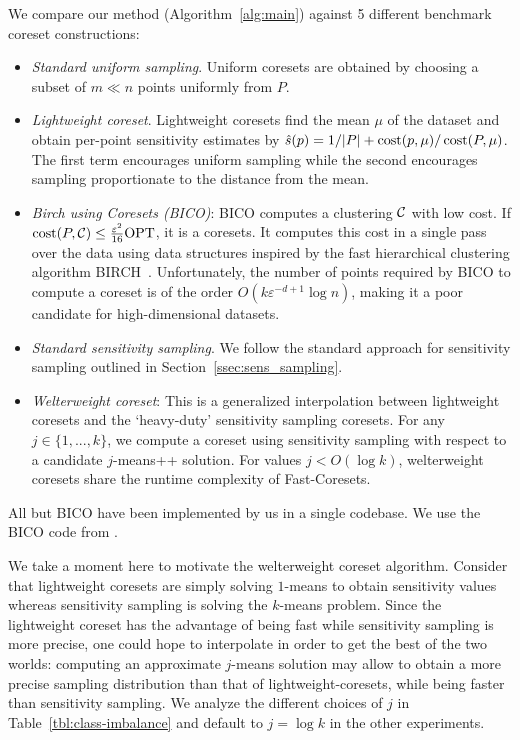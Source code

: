 We compare our method (Algorithm~\ref{alg:main}) against 5 different benchmark coreset constructions:
\begin{itemize}
        \item \emph{Standard uniform sampling}. Uniform coresets are obtained by choosing a subset of $m \ll n$ points uniformly from $P$.
        \item \emph{Lightweight coreset}. Lightweight coresets find the mean $\mu$ of the dataset and obtain per-point sensitivity estimates by $\hat{s}(p) = 1/|P| + \operatorname{cost}(p, \mu) / \operatorname{cost}(P, \mu)$.
            The first term encourages uniform sampling while the second encourages sampling proportionate to the distance from the mean.
        \item \emph{Birch using Coresets (BICO)}: BICO computes a clustering $\mathcal C$ with low cost. If $\operatorname{cost}(P,\mathcal C)\leq \frac{\varepsilon^2}{16} \text{OPT}$, it is a coresets. It computes this cost in a single pass over the data using data structures inspired by the fast hierarchical clustering algorithm BIRCH~\cite{birch}. Unfortunately, the number of points required by BICO to compute a coreset is of the order $O(k \varepsilon^{-d+1}\log n)$, making it a poor candidate for high-dimensional datasets.
        \item \emph{Standard sensitivity sampling}. We follow the standard approach for sensitivity sampling outlined in Section~\ref{ssec:sens_sampling}.
        \item \emph{Welterweight coreset}: This is a generalized interpolation between lightweight coresets and the `heavy-duty' sensitivity sampling coresets. For any $j
            \in \{1,..., k\}$, we compute a coreset using sensitivity sampling with respect to a candidate $j$-means++ solution. For values $j < O(\log k)$,
            welterweight coresets share the runtime complexity of Fast-Coresets.
\end{itemize}
All but BICO have been implemented by us in a single codebase. We use the BICO code from \cite{bico}.

We take a moment here to motivate the welterweight coreset algorithm.  Consider that lightweight coresets are simply solving $1$-means to obtain sensitivity
values whereas sensitivity sampling is solving the $k$-means problem. Since the lightweight coreset has the advantage of being fast while sensitivity sampling
is more precise, one could hope to interpolate in order to get the best of the two worlds: computing an approximate $j$-means solution may allow to obtain
a more precise sampling distribution than that of lightweight-coresets, while being faster than sensitivity sampling. We analyze the different choices of $j$ in
Table~\ref{tbl:class-imbalance} and default to $j = \log k$ in the other experiments.

